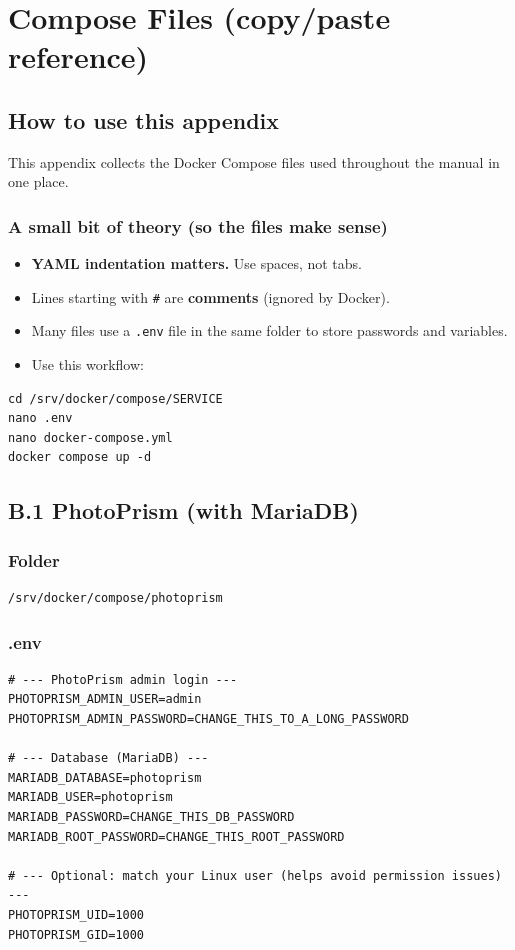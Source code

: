 \chapter{Compose Files (copy/paste reference)}
\label{app:compose}

\section{How to use this appendix}
This appendix collects the Docker Compose files used throughout the manual in one place.

\subsection*{A small bit of theory (so the files make sense)}
\begin{itemize}[leftmargin=*]
  \item \textbf{YAML indentation matters.} Use spaces, not tabs.
  \item Lines starting with \texttt{\#} are \textbf{comments} (ignored by Docker).
  \item Many files use a \texttt{.env} file in the same folder to store passwords and variables.
  \item Use this workflow:
\end{itemize}

\begin{lstlisting}
cd /srv/docker/compose/SERVICE
nano .env
nano docker-compose.yml
docker compose up -d
\end{lstlisting}


\section{B.1 PhotoPrism (with MariaDB)}
\subsection*{Folder}
\begin{lstlisting}
/srv/docker/compose/photoprism
\end{lstlisting}

\subsection*{.env}
\begin{lstlisting}
# --- PhotoPrism admin login ---
PHOTOPRISM_ADMIN_USER=admin
PHOTOPRISM_ADMIN_PASSWORD=CHANGE_THIS_TO_A_LONG_PASSWORD

# --- Database (MariaDB) ---
MARIADB_DATABASE=photoprism
MARIADB_USER=photoprism
MARIADB_PASSWORD=CHANGE_THIS_DB_PASSWORD
MARIADB_ROOT_PASSWORD=CHANGE_THIS_ROOT_PASSWORD

# --- Optional: match your Linux user (helps avoid permission issues) ---
PHOTOPRISM_UID=1000
PHOTOPRISM_GID=1000
\end{lstlisting}

